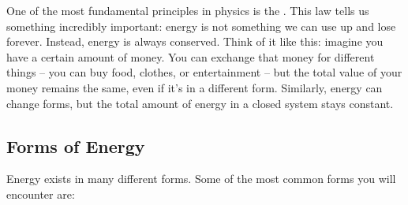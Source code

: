 One of the most fundamental principles in physics is the . This law tells us something incredibly important: energy is not something we can use up and lose forever. Instead, energy is always conserved.  Think of it like this: imagine you have a certain amount of money. You can exchange that money for different things – you can buy food, clothes, or entertainment – but the total value of your money remains the same, even if it's in a different form. Similarly, energy can change forms, but the total amount of energy in a closed system stays constant.

\subsection{Forms of Energy}

Energy exists in many different forms. Some of the most common forms you will encounter are:

